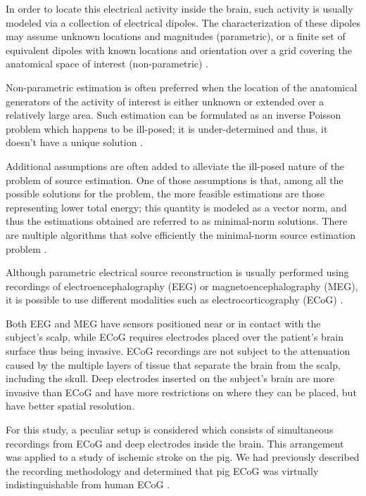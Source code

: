 \documentclass[draftcls, onecolumn, peerreview]{IEEEtran}
\begin{document}
In order to locate this electrical activity inside the brain, such activity is usually modeled via a collection of electrical dipoles.
%
The characterization of these dipoles may assume unknown locations and magnitudes (parametric), or a finite set of equivalent dipoles with known locations and orientation over a grid covering the anatomical space of interest (non-parametric)
%
\cite{classic_models}. 

Non-parametric estimation is often preferred when the location of the anatomical generators of the activity of interest is either unknown  or extended over a relatively large area.
%
Such estimation can be formulated as an inverse Poisson problem which happens to be ill-posed; it is under-determined and thus, it doesn't have a unique solution
\cite{hallez_review}.

Additional assumptions are often added to alleviate the ill-posed nature of the problem of source estimation.
%
One of those assumptions is that, among all the possible solutions for the problem, the more feasible estimations are those representing lower total energy; this quantity is modeled as a vector norm, and thus the estimations obtained are referred to as minimal-norm solutions.
%
%
There are multiple algorithms that solve efficiently the minimal-norm source estimation problem
\cite{eeg_source_location}.


Although parametric electrical source reconstruction is usually performed using recordings of electroencephalography (EEG) or magnetoencephalography (MEG),  it is possible to use different modalities such as electrocorticography (ECoG) \cite{ecog_other}.

Both EEG and MEG have sensors positioned near or in contact with the subject's scalp, while ECoG requires electrodes placed over the patient's brain surface thus being invasive.
%
ECoG recordings are not subject to the attenuation caused by the multiple layers of tissue that separate the brain from the scalp, including the skull.
%
Deep electrodes inserted on the subject's brain are more invasive than ECoG and have more restrictions on where they can be placed, but have better spatial resolution.

For this study, a peculiar setup is considered which consists of simultaneous recordings from ECoG and deep electrodes inside the brain.
%
This arrangement was applied to a study of ischemic stroke on the pig.
%
We had previously described the recording methodology and determined that pig ECoG was virtually indistinguishable from human ECoG \cite{PMID_36109613}.
\end{document}
